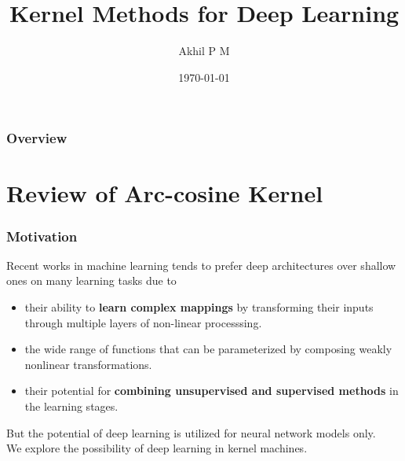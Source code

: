 \documentclass{beamer}
\title[KM for DL]{Kernel Methods for Deep Learning} %
\author{Akhil P M} %
\institute[] %
{
Supervisor : Sumitra S \\ %
}
\date{\today} %
\begin{document}
\begin{frame}
\titlepage %
\end{frame}

\begin{frame}
\frametitle{Overview} %
\tableofcontents %
\end{frame}


\section{Review of Arc-cosine Kernel} %
\begin{frame}
\frametitle{Motivation}
Recent works in machine learning tends to prefer deep architectures over shallow ones on many learning tasks due to
\begin{itemize}
\item their ability to \textbf{learn complex mappings} by transforming their inputs through multiple layers of non-linear processsing.
\item the wide range of functions that can be parameterized by composing weakly nonlinear transformations.
\item their potential for \textbf{combining unsupervised and supervised methods} in the learning stages.
\end{itemize}
But the potential of deep learning is utilized for neural network models only.\\
We explore the possibility of deep learning in kernel machines.
\end{frame}
\end{document}
